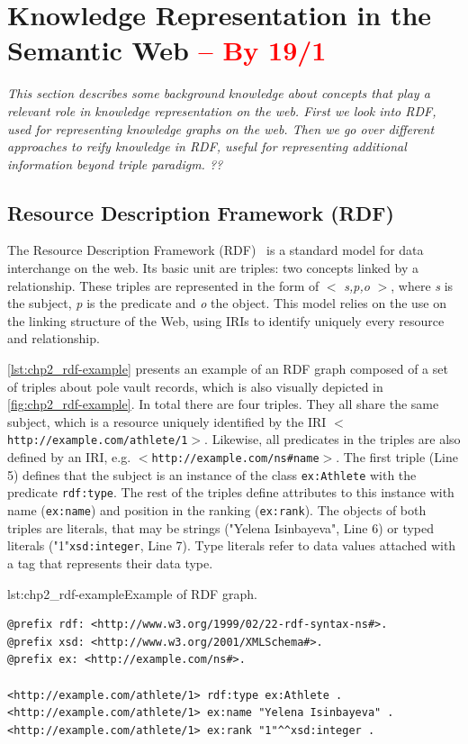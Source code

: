 \section{Knowledge Representation in the Semantic Web \textcolor{red}{-- By 19/1}}
\label{sec:chp2_semweb}

\textit{This section describes some background knowledge about concepts that play a relevant role in knowledge representation on the web. First we look into RDF, used for representing knowledge graphs on the web. Then we go over different approaches to reify knowledge in RDF, useful for representing additional information beyond triple paradigm. ??}

\subsection{Resource Description Framework (RDF)}

The Resource Description Framework (RDF)~\parencite{rdf} is a standard model for data interchange on the web. Its basic unit are triples: two concepts linked by a relationship. These triples are represented in the form of $<$ \textit{s,p,o} $>$, where \textit{s} is the subject, \textit{p} is the predicate and \textit{o} the object. This model relies on the use on the linking structure of the Web, using IRIs to identify uniquely every resource and relationship. 

\cref{lst:chp2_rdf-example} presents an example of an RDF graph composed of a set of triples about pole vault records, which is also visually depicted in \cref{fig:chp2_rdf-example}. In total there are four triples. They all share the same subject, which is a resource uniquely identified by the IRI $<$\texttt{http://example.com/athlete/1}$>$. Likewise, all predicates in the triples are also defined by an IRI, e.g. $<$\texttt{http://example.com/ns\#name}$>$. The first triple (Line 5) defines that the subject is an instance of the class \texttt{ex:Athlete} with the predicate \texttt{rdf:type}. The rest of the triples define attributes to this instance with name (\texttt{ex:name}) and position in the ranking (\texttt{ex:rank}). The objects of both triples are literals, that may be strings ("Yelena Isinbayeva", Line 6) or typed literals ("1"\scalebox{.8}{\textsuperscript{$\wedge\wedge$}}\texttt{xsd:integer}, Line 7). Type literals refer to data values attached with a tag that represents their data type.

\begin{minipage}{\textwidth}
\begin{captionedlisting}{lst:chp2_rdf-example}{Example of RDF graph.}
\centering
{\begin{lstlisting}[language=r2rml]
@prefix rdf: <http://www.w3.org/1999/02/22-rdf-syntax-ns#>.
@prefix xsd: <http://www.w3.org/2001/XMLSchema#>.
@prefix ex: <http://example.com/ns#>.

<http://example.com/athlete/1> rdf:type ex:Athlete .
<http://example.com/athlete/1> ex:name "Yelena Isinbayeva" .
<http://example.com/athlete/1> ex:rank "1"^^xsd:integer .
\end{lstlisting}}
\end{captionedlisting}
\end{minipage}

